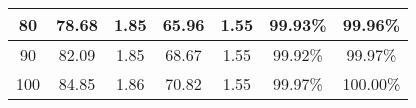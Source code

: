 \begin{table}[!htb]
\begin{tabular}{|c|c|c|c|c|c|c|}
  80                          &                   78.68 &                    1.85 &                         65.96 &                    1.55 &                 99.93\% &                 99.96\% \\ \hline
  90                          &                   82.09 &                    1.85 &                         68.67 &                    1.55 &                 99.92\% &                 99.97\% \\ \hline
  100                         &                   84.85 &                    1.86 &                         70.82 &                    1.55 &                 99.97\% &                100.00\% \\ \hline
  \end{tabular}
\end{table}